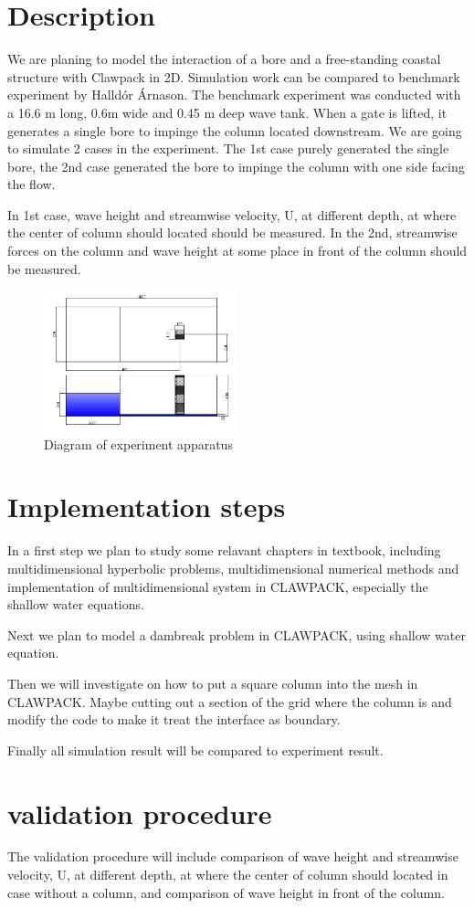 \documentclass[11pt]{article}
\begin{document}
\section{Description}
We are planing to model the interaction of a bore and a free-standing coastal structure with Clawpack in 2D.
Simulation work can be compared to benchmark experiment by Halld\'or \'Arnason.
The benchmark experiment was conducted with a 16.6 m long, 0.6m wide and 0.45 m deep wave tank. When a gate is lifted, it generates a single bore to impinge the column located downstream.
We are going to simulate 2 cases in the experiment. The 1st case purely generated the single bore, the 2nd case generated the bore to impinge the column with one side facing the flow.
\par
In 1st case, wave height and streamwise velocity, U, at different depth, at where the center of column should located should be measured. In the 2nd, streamwise forces on the column and wave height at some place in front of the column should be measured.
        \begin{figure}[h!]
            \centering
            \includegraphics[width=0.5\textwidth]{./figures/Diagram_case}
            \caption{Diagram of experiment apparatus}
        \end{figure}


\section{Implementation steps}
In a first step we plan to study some relavant chapters in textbook, including multidimensional hyperbolic problems, multidimensional numerical methods and implementation of multidimensional system in CLAWPACK, especially the shallow water equations. 
\par
Next we plan to model a dambreak problem in CLAWPACK, using shallow water equation.
\par
Then we will investigate on how to put a square column into the mesh in CLAWPACK. Maybe cutting out a section of the grid where the column is and modify the code to make it treat the interface as boundary. 
\par
Finally all simulation result will be compared to experiment result.
\section{validation procedure}
The validation procedure will include comparison of wave height and streamwise velocity, U, at different depth, at where the center of column should located in case without a column, and comparison of wave height in front of the column.
\end{document}
